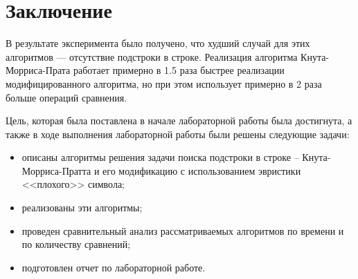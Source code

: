 \chapter*{Заключение}

В результате эксперимента было получено, что худший случай для этих алгоритмов --- отсутствие подстроки в строке.
Реализация алгоритма Кнута-Морриса-Прата работает примерно в 1.5 раза быстрее реализации модифицированного алгоритма, но при этом использует примерно в 2 раза больше операций сравнения.  

Цель, которая была поставлена в начале лабораторной работы была достигнута, а также в ходе выполнения лабораторной работы были решены следующие задачи:

\begin{itemize}[label=---]
    \item описаны алгоритмы решения задачи поиска подстроки в строке -- Кнута-Морриса-Пратта и его модификацию с использованием эвристики <<плохого>> символа;
	\item реализованы эти алгоритмы;
	\item проведен сравнительный анализ рассматриваемых алгоритмов по времени и по количеству сравнений;
	\item подготовлен отчет по лабораторной работе.
\end{itemize}